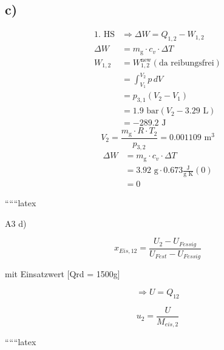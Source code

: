 \subsection*{c)}
\begin{align*}
    \text{1. HS} &\Rightarrow \Delta W = Q_{1,2} - W_{1,2} \\
    \Delta W &= m_{\text{g}} \cdot c_v \cdot \Delta T \\
    W_{1,2} &= W_{1,2}^{\text{new}} (\text{da reibungsfrei}) \\
    &= \int_{V_1}^{V_2} p \, dV \\
    &= p_{3,1} (V_2 - V_1) \\
    &= 1.9 \text{ bar} (V_2 - 3.29 \text{ L}) \\
    &= -289.2 \text{ J}
\end{align*}
\[
V_2 = \frac{m_{\text{g}} \cdot R \cdot T_2}{p_{3,2}} = 0.001109 \text{ m}^3
\]
\begin{align*}
    \Delta W &= m_{\text{g}} \cdot c_v \cdot \Delta T \\
    &= 3.92 \text{ g} \cdot 0.673 \frac{\text{J}}{\text{g K}} (0) \\
    &= 0
\end{align*}

``````latex


A3 d)

\[
x_{Eis,12} = \frac{U_2 - U_{Fessig}}{U_{Fest} - U_{Fessig}}
\]

mit Einsatzwert [Qrd = 1500g]

\[
\Rightarrow U = Q_{12}
\]

\[
u_2 = \frac{U}{M_{eis,2}}
\]

``````latex


